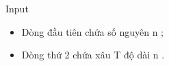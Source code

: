 Input
\begin{itemize}
	\item Dòng đầu tiên chứa số nguyên n ;
	\item Dòng thứ 2 chứa xâu T độ dài n .
\end{itemize}